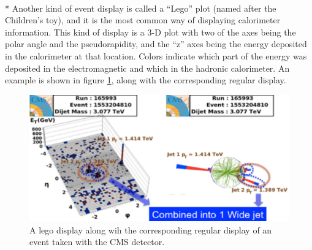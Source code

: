 \\*
Another kind of event display is called a ``Lego'' plot (named after the Children's toy), and it is the most common way of displaying calorimeter information.  This kind of display is a 3-D plot with two of the axes being the polar angle and the pseudorapidity, and the ``z'' axes being the energy deposited in the calorimeter at that location. Colors indicate which part of the energy was deposited in the electromagnetic and which in the hadronic calorimeter. An example is shown in figure \ref{fig:pid3}, along with the corresponding regular display.
\begin{figure}[h]
\centering\includegraphics[scale=0.5]{./particleID/Pictures/fig3.pdf}
\caption{A lego display along wih the corresponding regular display of an event taken with the CMS detector.}
\label{fig:pid3}
\end{figure}

